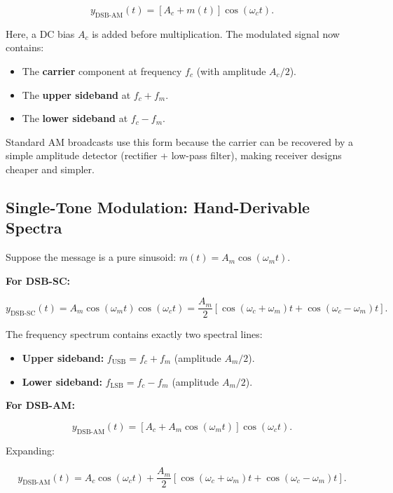 \documentclass[11pt,letterpaper]{article}
\begin{document}
\begin{equation}
y_{\text{DSB-AM}}(t) = [A_c + m(t)] \cos(\omega_c t).
\label{eq:dsbam}
\end{equation}

\noindent
Here, a DC bias $A_c$ is added before multiplication. The modulated signal now contains:
\begin{itemize}
    \item The \textbf{carrier} component at frequency $f_c$ (with amplitude $A_c/2$).
    \item The \textbf{upper sideband} at $f_c + f_m$.
    \item The \textbf{lower sideband} at $f_c - f_m$.
\end{itemize}

\noindent
Standard AM broadcasts use this form because the carrier can be recovered by a simple amplitude detector (rectifier + low-pass filter), making receiver designs cheaper and simpler.

\subsection{Single-Tone Modulation: Hand-Derivable Spectra}

Suppose the message is a pure sinusoid: $m(t) = A_m \cos(\omega_m t)$.

\noindent
\textbf{For DSB-SC:}

\begin{equation}
y_{\text{DSB-SC}}(t) = A_m \cos(\omega_m t) \cos(\omega_c t) = \frac{A_m}{2}[\cos(\omega_c + \omega_m) t + \cos(\omega_c - \omega_m) t].
\end{equation}

\noindent
The frequency spectrum contains exactly two spectral lines:
\begin{itemize}
    \item \textbf{Upper sideband:} $f_{\text{USB}} = f_c + f_m$ (amplitude $A_m/2$).
    \item \textbf{Lower sideband:} $f_{\text{LSB}} = f_c - f_m$ (amplitude $A_m/2$).
\end{itemize}

\noindent
\textbf{For DSB-AM:}

\begin{equation}
y_{\text{DSB-AM}}(t) = [A_c + A_m \cos(\omega_m t)] \cos(\omega_c t).
\end{equation}

\noindent
Expanding:

\begin{equation}
y_{\text{DSB-AM}}(t) = A_c \cos(\omega_c t) + \frac{A_m}{2}[\cos(\omega_c + \omega_m) t + \cos(\omega_c - \omega_m) t].
\end{equation}
\end{document}
